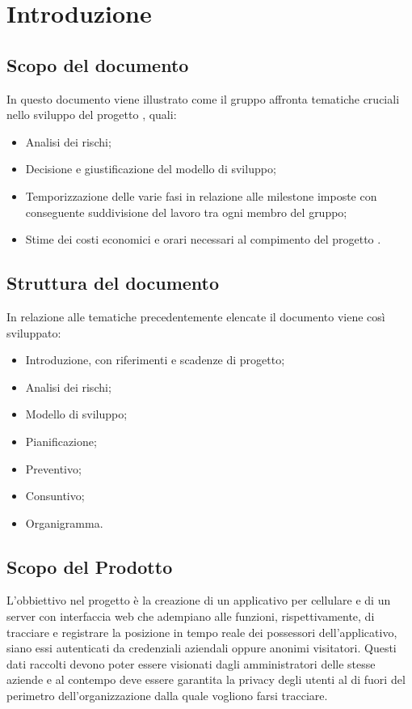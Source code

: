 \section{Introduzione}
\subsection{Scopo del documento}
In questo documento viene illustrato come  il gruppo \Gruppo{} affronta tematiche cruciali nello sviluppo del progetto \NomeProgetto{}, quali:
\begin{itemize}
    \item Analisi dei rischi;
    \item Decisione e giustificazione del modello di sviluppo;
    \item Temporizzazione delle varie fasi in relazione alle milestone imposte con conseguente suddivisione del lavoro tra ogni membro del gruppo;
    \item Stime dei costi economici e orari necessari al compimento del progetto \NomeProgetto{}.
\end{itemize}

\subsection{Struttura del documento}
In relazione alle tematiche precedentemente elencate il documento viene così sviluppato:
\begin{itemize}
    \item Introduzione, con riferimenti e scadenze di progetto;
    \item Analisi dei rischi;
    \item Modello di sviluppo;
    \item Pianificazione;
    \item Preventivo;
    \item Consuntivo;
    \item Organigramma.
\end{itemize}

\subsection{Scopo del Prodotto}
L'obbiettivo nel progetto \NomeProgetto{} è la creazione di un applicativo per cellulare e di un server con interfaccia web che adempiano alle funzioni, rispettivamente, di 
tracciare e registrare la posizione in tempo reale dei possessori dell'applicativo, siano essi autenticati da credenziali aziendali oppure anonimi visitatori.
Questi dati raccolti devono poter essere visionati dagli amministratori delle stesse aziende e al contempo deve essere garantita la privacy degli utenti al di fuori del perimetro dell'organizzazione dalla quale vogliono farsi tracciare.


